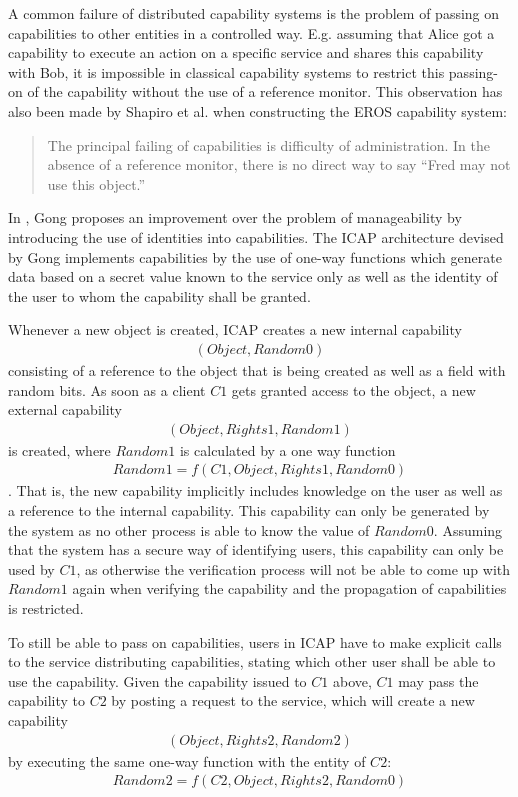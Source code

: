 A common failure of distributed capability systems is the problem of passing on capabilities to other entities in a controlled way.
E.g. assuming that Alice got a capability to execute an action on a specific service and shares this capability with Bob, it is impossible in classical capability systems to restrict this passing-on of the capability without the use of a reference monitor.
This observation has also been made by Shapiro et al. when constructing the EROS capability system:
\begin{quote}
    The principal failing of capabilities is difficulty of administration.
    In the absence of a reference monitor, there is no direct way to say ``Fred may not use this object.'' \cite{shapiro1999eros}
\end{quote}

In \cite{gong1989secure}, Gong proposes an improvement over the problem of manageability by introducing the use of identities into capabilities.
The ICAP architecture devised by Gong implements capabilities by the use of one-way functions which generate data based on a secret value known to the service only as well as the identity of the user to whom the capability shall be granted.

Whenever a new object is created, ICAP creates a new internal capability
\begin{align*}
    (Object, Random0)
\end{align*}
consisting of a reference to the object that is being created as well as a field with random bits.
As soon as a client $C1$ gets granted access to the object, a new external capability
\begin{align*}
    (Object, Rights1, Random1)
\end{align*}
is created, where $Random1$ is calculated by a one way function
\begin{align*}
    Random1 = f(C1, Object, Rights1, Random0)
\end{align*}.
That is, the new capability implicitly includes knowledge on the user as well as a reference to the internal capability.
This capability can only be generated by the system as no other process is able to know the value of $Random0$.
Assuming that the system has a secure way of identifying users, this capability can only be used by $C1$, as otherwise the verification process will not be able to come up with $Random1$ again when verifying the capability and the propagation of capabilities is restricted.

To still be able to pass on capabilities, users in ICAP have to make explicit calls to the service distributing capabilities, stating which other user shall be able to use the capability.
Given the capability issued to $C1$ above, $C1$ may pass the capability to $C2$ by posting a request to the service, which will create a new capability
\begin{align*}
    (Object, Rights2, Random2)
\end{align*}
by executing the same one-way function with the entity of $C2$:
\begin{align*}
    Random2 = f(C2, Object, Rights2, Random0)
\end{align*}

